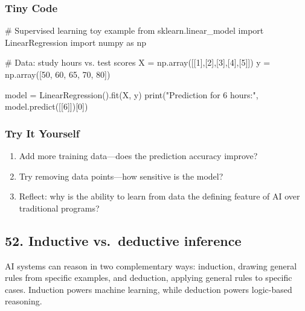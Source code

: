 \documentclass[
  letterpaper,
  DIV=11,
  numbers=noendperiod]{scrreprt}
\newenvironment{Shaded}{\begin{snugshade}}{\end{snugshade}}
\newcommand{\BuiltInTok}[1]{\textcolor[rgb]{0.00,0.23,0.31}{#1}}
\newcommand{\CommentTok}[1]{\textcolor[rgb]{0.37,0.37,0.37}{#1}}
\newcommand{\DecValTok}[1]{\textcolor[rgb]{0.68,0.00,0.00}{#1}}
\newcommand{\ImportTok}[1]{\textcolor[rgb]{0.00,0.46,0.62}{#1}}
\newcommand{\NormalTok}[1]{\textcolor[rgb]{0.00,0.23,0.31}{#1}}
\newcommand{\OperatorTok}[1]{\textcolor[rgb]{0.37,0.37,0.37}{#1}}
\newcommand{\StringTok}[1]{\textcolor[rgb]{0.13,0.47,0.30}{#1}}
\providecommand{\tightlist}{%
  \setlength{\itemsep}{0pt}\setlength{\parskip}{0pt}}
\begin{document}
\subsubsection{Tiny Code}\label{tiny-code-50}

\begin{Shaded}
\begin{Highlighting}[]
\CommentTok{\# Supervised learning toy example}
\ImportTok{from}\NormalTok{ sklearn.linear\_model }\ImportTok{import}\NormalTok{ LinearRegression}
\ImportTok{import}\NormalTok{ numpy }\ImportTok{as}\NormalTok{ np}

\CommentTok{\# Data: study hours vs. test scores}
\NormalTok{X }\OperatorTok{=}\NormalTok{ np.array([[}\DecValTok{1}\NormalTok{],[}\DecValTok{2}\NormalTok{],[}\DecValTok{3}\NormalTok{],[}\DecValTok{4}\NormalTok{],[}\DecValTok{5}\NormalTok{]])}
\NormalTok{y }\OperatorTok{=}\NormalTok{ np.array([}\DecValTok{50}\NormalTok{, }\DecValTok{60}\NormalTok{, }\DecValTok{65}\NormalTok{, }\DecValTok{70}\NormalTok{, }\DecValTok{80}\NormalTok{])}

\NormalTok{model }\OperatorTok{=}\NormalTok{ LinearRegression().fit(X, y)}
\BuiltInTok{print}\NormalTok{(}\StringTok{"Prediction for 6 hours:"}\NormalTok{, model.predict([[}\DecValTok{6}\NormalTok{]])[}\DecValTok{0}\NormalTok{])}
\end{Highlighting}
\end{Shaded}

\subsubsection{Try It Yourself}\label{try-it-yourself-50}

\begin{enumerate}
\def\labelenumi{\arabic{enumi}.}
\tightlist
\item
  Add more training data---does the prediction accuracy improve?
\item
  Try removing data points---how sensitive is the model?
\item
  Reflect: why is the ability to learn from data the defining feature of
  AI over traditional programs?
\end{enumerate}

\subsection{52. Inductive vs.~deductive
inference}\label{inductive-vs.-deductive-inference}

AI systems can reason in two complementary ways: induction, drawing
general rules from specific examples, and deduction, applying general
rules to specific cases. Induction powers machine learning, while
deduction powers logic-based reasoning.
\end{document}
